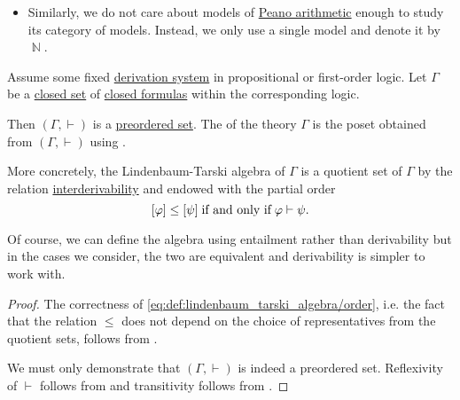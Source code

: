 \begin{example}
\begin{itemize}
    \item Similarly, we do not care about models of \hyperref[def:peano_arithmetic]{Peano arithmetic} enough to study its category of models. Instead, we only use a single model and denote it by \( \BbbN \).
  \end{itemize}
\end{example}

\begin{definition}\label{def:lindenbaum_tarski_algebra}
  Assume some fixed \hyperref[def:proof_derivation_system]{derivation system} in propositional or first-order logic. Let \( \Gamma \) be a \hyperref[def:first_order_theory]{closed set} of \hyperref[def:first_order_syntax/ground_formula]{closed formulas} within the corresponding logic.

  Then \( (\Gamma, \vdash) \) is a \hyperref[def:preordered_set]{preordered set}. The  of the theory \( \Gamma \) is the poset obtained from \( (\Gamma, \vdash) \) using .

  More concretely, the Lindenbaum-Tarski algebra of \( \Gamma \) is a quotient set of \( \Gamma \) by the relation \hyperref[def:derivation_system_derivability]{interderivability} and endowed with the partial order
  \begin{equation}\label{eq:def:lindenbaum_tarski_algebra/order}
    [\varphi] \leq [\psi] \T{if and only if} \varphi \vdash \psi.
  \end{equation}

  Of course, we can define the algebra using entailment rather than derivability but in the cases we consider, the two are equivalent and derivability is simpler to work with.
\end{definition}
\begin{proof}
  The correctness of \eqref{eq:def:lindenbaum_tarski_algebra/order}, i.e. the fact that the relation \( \leq \) does not depend on the choice of representatives from the quotient sets, follows from .

  We must only demonstrate that \( (\Gamma, \vdash) \) is indeed a preordered set. Reflexivity of \( \vdash \) follows from  and transitivity follows from .
\end{proof}

